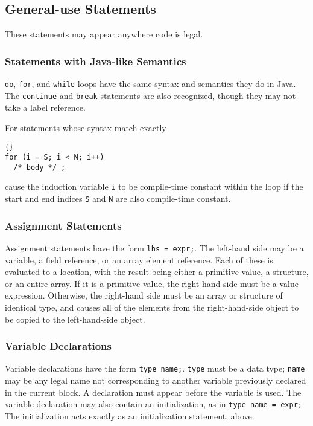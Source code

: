 \documentclass[11pt]{article}
\begin{document}
\subsection{General-use Statements}

These statements may appear anywhere code is legal.

\subsubsection{Statements with Java-like Semantics}

\lstinline|do|, \lstinline|for|, and \lstinline|while| loops have the same
syntax and semantics they do in Java.  The \lstinline|continue| and
\lstinline|break| statements are also recognized, though they may not
take  a label reference.

For statements whose syntax match exactly

\begin{lstlisting}{}
for (i = S; i < N; i++)
  /* body */ ;
\end{lstlisting}

\noindent
cause the induction variable \lstinline|i| to be compile-time constant
within the loop if the start and end indices \lstinline|S| and \lstinline|N| are
also compile-time constant.

\subsubsection{Assignment Statements}

Assignment statements have the form \lstinline|lhs = expr;|.  The left-hand
side may be a variable, a field reference, or an array element
reference.  Each of these is evaluated to a location, with the result
being either a primitive value, a structure, or an entire array.  If
it is a primitive value, the right-hand side must be a value
expression.  Otherwise, the right-hand side must be an array or
structure of identical type, and causes all of the elements from the
right-hand-side object to be copied to the left-hand-side object.

\subsubsection{Variable Declarations}

Variable declarations have the form \lstinline|type name;|.  \lstinline|type|
must be a data type; \lstinline|name| may be any legal name not
corresponding to another variable previously declared in the current
block.  A declaration must appear before the variable is used.  The
variable declaration may also contain an initialization, as in
\lstinline|type name = expr;|  The initialization acts exactly as an
initialization statement, above.
\end{document}
